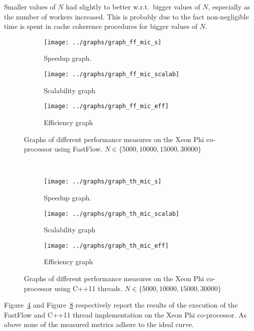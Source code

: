 Smaller values of $N$ had slightly to better w.r.t.\ bigger values of $N$, especially as the number of workers increased.
This is probably due to the fact non-negligible time is spent in cache coherence procedures for bigger values of $N$.

\begin{figure}[h]
	\centering
	\begin{subfigure}[b]{0.3\textwidth}
		\texttt{[image: ../graphs/graph\_ff\_mic\_s]}
		\caption{Speedup graph.}
		\label{fig:ff_mic_s}
	\end{subfigure}
	\begin{subfigure}[b]{0.3\textwidth}
		\texttt{[image: ../graphs/graph\_ff\_mic\_scalab]}
		\caption{Scalability graph}
		\label{fig:ff_mic_scalab}
	\end{subfigure}
	\begin{subfigure}[b]{0.3\textwidth}
		\texttt{[image: ../graphs/graph\_ff\_mic\_eff]}
		\caption{Efficiency graph}
		\label{fig:ff_mic_eff}
	\end{subfigure}
	\caption{Graphs of different performance measures  on the Xeon Phi co-processor using FastFlow. $N \in \{ 5000, 10000, 15000, 30000\}$}
	\label{fig:ff_mic}
\end{figure}
~
\begin{figure}[h]
	\centering
	\begin{subfigure}[b]{0.3\textwidth}
		\texttt{[image: ../graphs/graph\_th\_mic\_s]}
		\caption{Speedup graph.}
		\label{fig:th_mic_s}
	\end{subfigure}
	\begin{subfigure}[b]{0.3\textwidth}
		\texttt{[image: ../graphs/graph\_th\_mic\_scalab]}
		\caption{Scalability graph}
		\label{fig:th_mic_scalab}
	\end{subfigure}
	\begin{subfigure}[b]{0.3\textwidth}
		\texttt{[image: ../graphs/graph\_th\_mic\_eff]}
		\caption{Efficiency graph}
		\label{fig:th_mic_eff}
	\end{subfigure}
	\caption{Graphs of different performance measures  on the Xeon Phi co-processor using C++11 threads. $N \in \{ 5000, 10000, 15000, 30000\}$}
	\label{fig:th_mic}
\end{figure}

Figure~\ref{fig:ff_mic} and Figure~\ref{fig:th_mic} respectively report the results of the execution of the FastFlow and C++11 thread implementation on the Xeon Phi co-processor.
As above none of the measured metrics adhere to the ideal curve.

